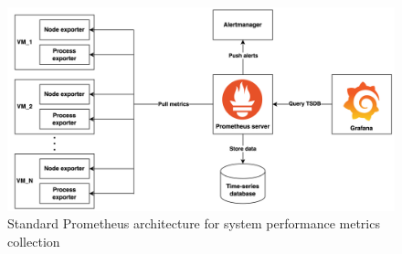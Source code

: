 \begin{figure}[htb]
  \centering
  \includegraphics[width=1\linewidth]{images/prometheus.png}
  \caption{Standard Prometheus architecture for system performance metrics collection}
  \label{fig:prometheus}
\end{figure}

